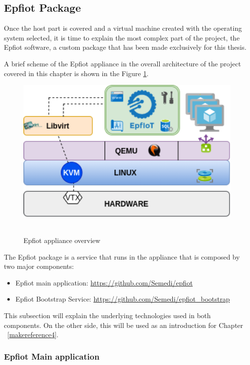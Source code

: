 \subsection{Epfiot Package}
\label{makereference3.2.2}

Once the host part is covered and a virtual machine created with the operating system selected, it is time to explain the most complex part of the project, the Epfiot software, a custom package that has been made exclusively for this thesis. 

A brief scheme of the Epfiot appliance in the overall architecture of the project covered in this chapter is shown in the Figure \ref{figure3.3}.

\begin{figure}[h!]%
\centering
    \includegraphics[width=5.5in]{figures/Epfiot_appliance.png}
~\caption{Epfiot appliance overview}
\label{figure3.3}
\end{figure}

The Epfiot package is a service that runs in the appliance that is composed by two major components:
\begin{itemize}
    \item Epfiot main application: \url{https://github.com/Semedi/epfiot}
    \item Epfiot Bootstrap Service: \url{https://github.com/Semedi/epfiot_bootstrap}
\end{itemize}

This subsection will explain the underlying technologies used in both components. On the other side, this will be used as an introduction for Chapter ~\ref{makereference4}. 
\newpage

\subsubsection{Epfiot Main application}

